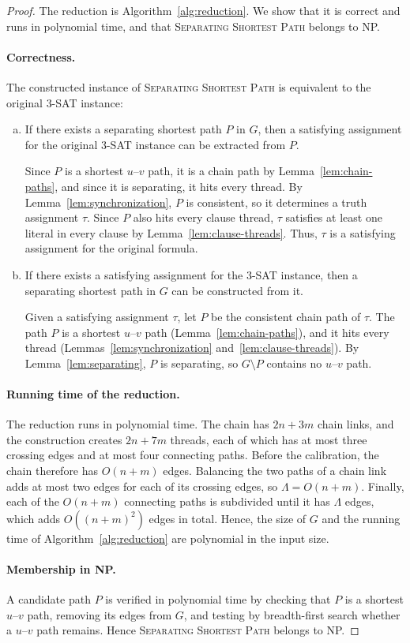 \documentclass[a4paper,fleqn]{cas-sc}
\numberwithin{equation}{section}
\theoremstyle{definition}
\theoremstyle{plain}
\theoremstyle{remark}
\newcommand{\SSP}{\textsc{Separating Shortest Path}}
\newcommand{\ThreeSAT}{\textsc{3-SAT}}
\begin{document}
\begin{proof}
The reduction is Algorithm~\ref{alg:reduction}.
We show that it is correct and runs in polynomial time, and that \SSP{} belongs to NP.

\paragraph{Correctness.}
The constructed instance of \SSP{} is equivalent to the original \ThreeSAT{} instance:
\begin{enumerate}[(a)]
    \item If there exists a separating shortest path $P$ in $G$, then a satisfying assignment for the original \ThreeSAT{} instance can be extracted from $P$.

    Since $P$ is a shortest $u$--$v$ path, it is a chain path by Lemma~\ref{lem:chain-paths}, and since it is separating, it hits every thread.
    By Lemma~\ref{lem:synchronization}, $P$ is consistent, so it determines a truth assignment $\tau$.
    Since $P$ also hits every clause thread, $\tau$ satisfies at least one literal in every clause by Lemma~\ref{lem:clause-threads}.
    Thus, $\tau$ is a satisfying assignment for the original formula.

    \item If there exists a satisfying assignment for the \ThreeSAT{} instance, then a separating shortest path in $G$ can be constructed from it.

    Given a satisfying assignment $\tau$, let $P$ be the consistent chain path of $\tau$.
    The path $P$ is a shortest $u$--$v$ path (Lemma~\ref{lem:chain-paths}), and it hits every thread (Lemmas~\ref{lem:synchronization} and~\ref{lem:clause-threads}).
    By Lemma~\ref{lem:separating}, $P$ is separating, so $G\setminus P$ contains no $u$--$v$ path.
\end{enumerate}

\paragraph{Running time of the reduction.}
The reduction runs in polynomial time.
The chain has $2n+3m$ chain links, and the construction creates $2n+7m$ threads, each of which has at most three crossing edges and at most four connecting paths.
Before the calibration, the chain therefore has $O(n+m)$ edges.
Balancing the two paths of a chain link adds at most two edges for each of its crossing edges, so $\Lambda = O(n+m)$.
Finally, each of the $O(n+m)$ connecting paths is subdivided until it has $\Lambda$ edges, which adds $O((n+m)^2)$ edges in total.
Hence, the size of $G$ and the running time of Algorithm~\ref{alg:reduction} are polynomial in the input size.

\paragraph{Membership in NP.}
A candidate path $P$ is verified in polynomial time by checking that $P$ is a shortest $u$--$v$ path, removing its edges from $G$, and testing by breadth-first search whether a $u$--$v$ path remains.
Hence \SSP{} belongs to NP.
\end{proof}
\end{document}
